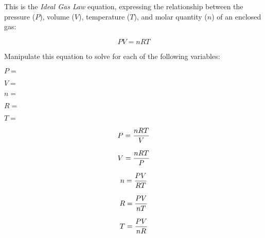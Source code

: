 

This is the {\it Ideal Gas Law} equation, expressing the relationship between the pressure ($P$), volume ($V$), temperature ($T$), and molar quantity ($n$) of an enclosed gas:

$$PV = nRT$$

Manipulate this equation to solve for each of the following variables:

\vskip 10pt

$P =$

\vskip 10pt

$V =$

\vskip 10pt

$n =$

\vskip 10pt

$R =$

\vskip 10pt

$T =$

\vskip 10pt







$$P = {nRT \over V}$$

\vskip 20pt

$$V = {nRT \over P}$$

\vskip 20pt

$$n = {PV \over RT}$$

\vskip 20pt

$$R = {PV \over nT}$$

\vskip 20pt

$$T = {PV \over nR}$$












